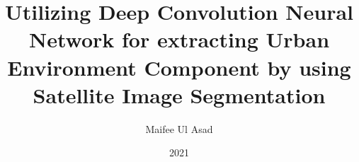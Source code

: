 \documentclass[12pt,oneside]{book}
\begin{document}
	
	\title{
	Utilizing Deep Convolution Neural Network for extracting Urban Environment Component by using Satellite Image Segmentation
		}
	\author{Maifee Ul Asad}
	\date{2021} 
	\degree{ } 
	
	\frontmatter
	\maketitle
	
	
	
	
	
	
	\cleardoublepage
	 {} 
	\tableofcontents
	\listoffigures
	
	
	
	
	
	\cleardoublepage
	\mainmatter
	
	
	
	
	
	
	
	
	
	
	\cleardoublepage
	\appendix
	
	
	
	\cleardoublepage
	\printbibliography
	
	

	
\end{document}
